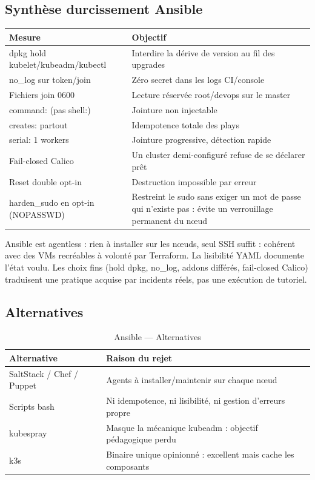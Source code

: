 \documentclass[12pt,a4paper,twoside,openright]{report}
\begin{document}
\subsection{Synthèse durcissement Ansible}
\begin{center}\label{tab:ch-synthese-durcissement-ansible}\end{center}
\begin{longtable}{@{}p{5.4cm}p{8.8cm}@{}}
\toprule
\textbf{Mesure} & \textbf{Objectif} \\
\midrule
\endhead
dpkg hold kubelet/kubeadm/kubectl & Interdire la dérive de version au fil des upgrades \\
no\_log sur token/join & Zéro secret dans les logs CI/console \\
Fichiers join 0600 & Lecture réservée root/devops sur le master \\
command: (pas shell:) & Jointure non injectable \\
creates: partout & Idempotence totale des plays \\
serial: 1 workers & Jointure progressive, détection rapide \\
Fail-closed Calico & Un cluster demi-configuré refuse de se déclarer prêt \\
Reset double opt-in & Destruction impossible par erreur \\
harden\_sudo en opt-in (NOPASSWD) & Restreint le sudo sans exiger un mot de passe qui n'existe pas : évite un verrouillage permanent du nœud \\
\bottomrule
\end{longtable}

\begin{whybox}
Ansible est agentless : rien à installer sur les nœuds, seul SSH suffit : cohérent avec des VMs recréables à volonté par Terraform. La lisibilité YAML documente l'état voulu. Les choix fins (hold dpkg, no\_log, addons différés, fail-closed Calico) traduisent une pratique acquise par incidents réels, pas une exécution de tutoriel.
\end{whybox}

\subsection{Alternatives}
\begin{table}[H]
\centering\small
\caption{Ansible --- Alternatives}\label{tab:ch-ansible-alternatives}
\begin{tabular}{@{}lp{10.5cm}@{}}
\toprule
\textbf{Alternative} & \textbf{Raison du rejet} \\
\midrule
SaltStack / Chef / Puppet & Agents à installer/maintenir sur chaque nœud \\
Scripts bash & Ni idempotence, ni lisibilité, ni gestion d'erreurs propre \\
kubespray & Masque la mécanique kubeadm : objectif pédagogique perdu \\
k3s & Binaire unique opinionné : excellent mais cache les composants \\
\bottomrule
\end{tabular}
\end{table}
\end{document}
